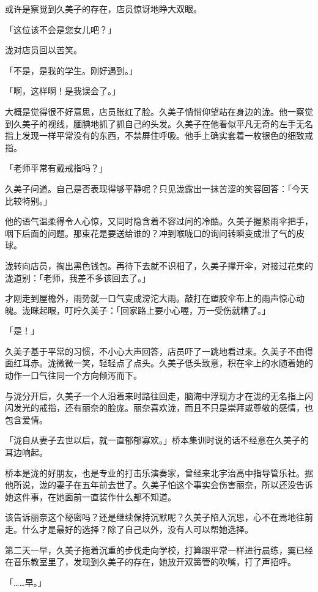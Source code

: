 \documentclass[UTF8]{ctexart}
\begin{document}
    或许是察觉到久美子的存在，店员惊讶地睁大双眼。 

    「这位该不会是您女儿吧？」 

    泷对店员回以苦笑。 

    「不是，是我的学生。刚好遇到。」 

    「啊，这样啊！是我误会了。」 

    大概是觉得很不好意思，店员胀红了脸。久美子悄悄仰望站在身边的泷。他一察觉到久美子的视线，腼腆地抓了抓自己的头发。久美子在他看似平凡无奇的左手无名指上发现一样平常没有的东西，不禁屏住呼吸。他手上确实套着一枚银色的细致戒指。 

    「老师平常有戴戒指吗？」 

    久美子问道。自己是否表现得够平静呢？只见泷露出一抹苦涩的笑容回答：「今天比较特别。」 

    他的语气温柔得令人心惊，又同时隐含着不容过问的冷酷。久美子握紧雨伞把手，咽下后面的问题。那束花是要送给谁的？冲到喉咙口的询问转瞬变成泄了气的皮球。 

    泷转向店员，掏出黑色钱包。再待下去就不识相了，久美子撑开伞，对接过花束的泷道别：「老师，我差不多该回去了。」 

    才刚走到屋檐外，雨势就一口气变成滂沱大雨。敲打在塑胶伞布上的雨声惊心动魄。泷眯起眼，叮咛久美子：「回家路上要小心喔，万一受伤就糟了。」 

    「是！」 

    久美子基于平常的习惯，不小心大声回答，店员吓了一跳地看过来。久美子不由得面红耳赤。泷微微一笑，轻轻点了点头。久美子低头致意，积在伞上的水随着她的动作一口气往同一个方向倾泻而下。 

    与泷分开后，久美子一个人沿着来时路往回走，脑海中浮现方才在泷的无名指上闪闪发光的戒指，还有丽奈的脸庞。丽奈喜欢泷，而且不只是崇拜或尊敬的感情，也包含爱情。 

    「泷自从妻子去世以后，就一直郁郁寡欢。」桥本集训时说的话不经意在久美子的耳边响起。 

    桥本是泷的好朋友，也是专业的打击乐演奏家，曾经来北宇治高中指导管乐社。据他所说，泷的妻子在五年前去世了。久美子怕这个事实会伤害丽奈，所以还没告诉她这件事，在她面前一直装作什么都不知道。 

    该告诉丽奈这个秘密吗？还是继续保持沉默呢？久美子陷入沉思，心不在焉地往前走。什么才是最好的选择？除了自己以外，没有人可以帮她选择。 

    第二天一早，久美子拖着沉重的步伐走向学校，打算跟平常一样进行晨练，霙已经在音乐教室里了，发现到久美子的存在，她放开双簧管的吹嘴，打了声招呼。 

    「……早。」 
\end{document}
